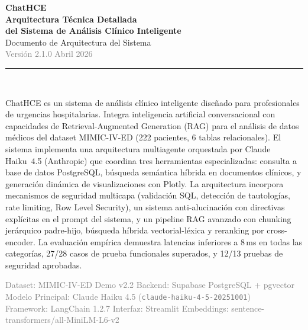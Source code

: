 ﻿\documentclass[11pt,a4paper]{article}
\begin{document}
\begin{titlepage}
\centering\vspace*{2cm}
{\Huge\bfseries\textcolor{primary}{ChatHCE}\\[0.5em]}
{\LARGE\bfseries\textcolor{secondary}{Arquitectura T\'ecnica Detallada\\[0.3em]del Sistema de An\'alisis Cl\'inico Inteligente}\\[1.5em]}
{\large Documento de Arquitectura del Sistema\\[0.3em]}
{\normalsize\textcolor{gray}{Versi\'on 2.1.0 \quad\textbullet\quad Abril 2026}\\[2em]}
\textcolor{primary}{\rule{0.7\textwidth}{1pt}}\\[2em]
\begin{tcolorbox}[colback=lightbg,colframe=primary!60,width=0.85\textwidth,arc=5pt,
  title={\bfseries\textcolor{primary}{Resumen Ejecutivo}},fonttitle=\normalsize]
ChatHCE es un sistema de an\'alisis cl\'inico inteligente dise\~nado para profesionales de urgencias hospitalarias. Integra inteligencia artificial conversacional con capacidades de Retrieval-Augmented Generation (RAG) para el an\'alisis de datos m\'edicos del dataset MIMIC-IV-ED (222 pacientes, 6 tablas relacionales). El sistema implementa una arquitectura multiagente orquestada por Claude Haiku~4.5 (Anthropic) que coordina tres herramientas especializadas: consulta a base de datos PostgreSQL, b\'usqueda sem\'antica h\'ibrida en documentos cl\'inicos, y generaci\'on din\'amica de visualizaciones con Plotly. La arquitectura incorpora mecanismos de seguridad multicapa (validaci\'on SQL, detecci\'on de tautolog\'ias, rate limiting, Row Level Security), un sistema anti-alucinaci\'on con directivas expl\'icitas en el prompt del sistema, y un pipeline RAG avanzado con chunking jer\'arquico padre-hijo, b\'usqueda h\'ibrida vectorial-l\'exica y reranking por cross-encoder. La evaluaci\'on emp\'irica demuestra latencias inferiores a 8\,ms en todas las categor\'ias, 27/28 casos de prueba funcionales superados, y 12/13 pruebas de seguridad aprobadas.
\end{tcolorbox}
\vfill
{\small\textcolor{gray}{Dataset: MIMIC-IV-ED Demo v2.2 \quad\textbullet\quad Backend: Supabase PostgreSQL + pgvector\\
Modelo Principal: Claude Haiku 4.5 (\texttt{claude-haiku-4-5-20251001})\\
Framework: LangChain 1.2.7 \quad\textbullet\quad Interfaz: Streamlit \quad\textbullet\quad Embeddings: sentence-transformers/all-MiniLM-L6-v2}}
\end{titlepage}
\end{document}
